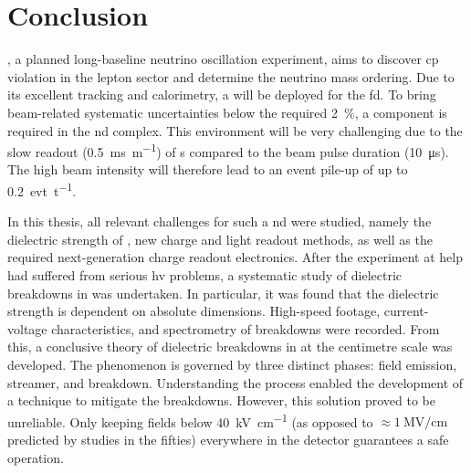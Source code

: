 \chapter{Conclusion}
\label{chap:conclusion}

\dune{}, a planned long-baseline neutrino oscillation experiment, aims to discover \gls{cp} violation in the lepton sector and determine the neutrino mass ordering.
Due to its excellent tracking and calorimetry, a \lartpc{} will be deployed for the \gls{fd}.
To bring beam-related systematic uncertainties below the required \SI{2}{\percent}, a \lartpc{} component is required in the \gls{nd} complex.
This environment will be very challenging due to the slow readout (\SI{0.5}{\milli\second\per\metre}) of \lartpc{}s compared to the beam pulse duration (\SI{10}{\micro\second}).
The high beam intensity will therefore lead to an event pile-up of up to \SI{0.2}{evt\per\tonne_{\lar}}.

In this thesis, all relevant challenges for such a \gls{nd} \lartpc{} were studied, namely the dielectric strength of \lar{}, new charge and light readout methods, as well as the required next-generation charge readout electronics.
After the \AT{} experiment at \gls{help} had suffered from serious \gls{hv} problems, a systematic study of dielectric breakdowns in \lar{} was undertaken.
In particular, it was found that the dielectric strength is dependent on absolute dimensions.
High-speed footage, current-voltage characteristics, and spectrometry of breakdowns were recorded.
From this, a conclusive theory of dielectric breakdowns in \lar{} at the centimetre scale was developed.
The phenomenon is governed by three distinct phases: field emission, streamer, and breakdown.
Understanding the process enabled the development of a technique to mitigate the breakdowns.
However, this solution proved to be unreliable.
Only keeping fields below \SI{40}{\kilo\volt\per\centi\metre} (as opposed to $\approx \SI{1}{\mega\volt\per\centi\metre}$ predicted by studies in the fifties) everywhere in the detector guarantees a safe operation.


